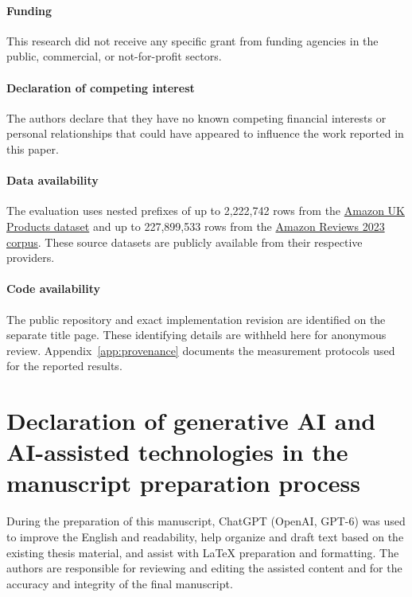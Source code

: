 \documentclass[preprint,12pt,times,a4paper]{elsarticle}
\begin{document}
\paragraph{Funding} This research did not receive any specific grant from funding agencies in the public, commercial, or not-for-profit sectors.

\paragraph{Declaration of competing interest} The authors declare that they have no known competing financial interests or personal relationships that could have appeared to influence the work reported in this paper.

\paragraph{Data availability}
The evaluation uses nested prefixes of up to 2,222,742 rows from the
\href{https://www.kaggle.com/datasets/asaniczka/amazon-uk-products-dataset-2023}{Amazon UK Products dataset}
and up to 227,899,533 rows from the
\href{https://amazon-reviews-2023.github.io/}{Amazon Reviews 2023 corpus}.
These source datasets are publicly available from their respective providers.

\paragraph{Code availability}
The public repository and exact implementation revision are identified on
the separate title page. These identifying details are withheld here for
anonymous review. Appendix~\ref{app:provenance} documents the measurement
protocols used for the reported results.

\section*{Declaration of generative AI and AI-assisted technologies in the manuscript preparation process}
During the preparation of this manuscript, ChatGPT (OpenAI, GPT-6) was used to improve
the English and readability, help organize and draft text based on the
existing thesis material, and assist with \LaTeX{} preparation and formatting.
The authors are responsible for reviewing and editing the assisted content
and for the accuracy and integrity of the final manuscript.



\end{document}
